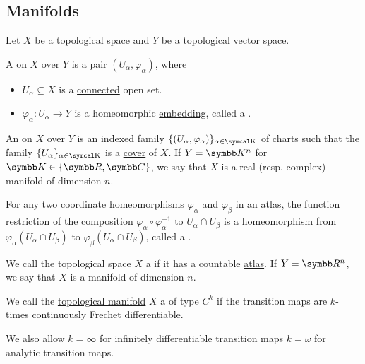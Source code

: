 \subsection{Manifolds}\label{subsec:manifolds}

\begin{Definition}\label{def:atlas}\cite[definition 12.1]{Иванов2017}
  Let \( X \) be a \hyperref[def:topological_space]{topological space} and \( Y \) be a \hyperref[def:topological_vector_space]{topological vector space}.

  A  on \( X \) over \( Y \) is a pair \( (U_\alpha, \varphi_\alpha) \), where
  \begin{itemize}
    \item \( U_\alpha \subseteq X \) is a \hyperref[def:connected_space]{connected} open set.
    \item \( \varphi_\alpha: U_\alpha \to Y \) is a homeomorphic \hyperref[def:homeomorphism]{embedding}, called a .
  \end{itemize}

  An  on \( X \) over \( Y \) is an indexed \hyperref[def:indexed_family]{family} \( \{ (U_\alpha, \varphi_\alpha) \}_{\alpha \in \CK} \) of charts such that the family \( \{ U_\alpha \}_{\alpha \in \CK} \) is a \hyperref[def:set_partition]{cover} of \( X \). If \( Y = \BK^n \) for \( \BK \in \{ \BR, \BC \} \), we say that \( X \) is a real (resp. complex) manifold of dimension \( n \).

  For any two coordinate homeomorphisms \( \varphi_\alpha \) and \( \varphi_\beta \) in an atlas, the function restriction of the composition \( \varphi_\alpha \circ \varphi_\alpha^{-1} \) to \( U_\alpha \cap U_\beta \) is a homeomorphism from \( \varphi_\alpha(U_\alpha \cap U_\beta) \) to \( \varphi_\beta(U_\alpha \cap U_\beta) \), called a .
\end{Definition}

\begin{Definition}\label{def:topological_manifold}\cite[definition 12.4]{Иванов2017}
  We call the topological space \( X \) a  if it has a countable \hyperref[def:atlas]{atlas}. If \( Y = \BR^n \), we say that \( X \) is a manifold of dimension \( n \).
\end{Definition}

\begin{Definition}\label{def:differentiable_manifold}\cite[definition 12.6]{Иванов2017}
  We call the \hyperref[def:topological_manifold]{topological manifold} \( X \) a  of type \( C^k \) if the transition maps are \( k \)-times continuously \hyperref[def:differentiability/frechet]{Frechet} differentiable.

  We also allow \( k = \infty \) for infinitely differentiable transition maps \( k = \omega \) for analytic transition maps.
\end{Definition}
